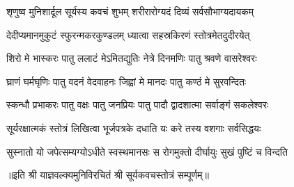 


\twolineshloka
{शृणुष्व मुनिशार्दूल सूर्यस्य कवचं शुभम्}
{शरीरारोग्यदं दिव्यं सर्वसौभाग्यदायकम्}

\twolineshloka
{देदीप्यमानमुकुटं स्फुरन्मकरकुण्डलम्}
{ध्यात्वा सहस्रकिरणं स्तोत्रमेतदुदीरयेत्}

\twolineshloka
{शिरो मे भास्करः पातु ललाटं मेऽमितद्युतिः}
{नेत्रे दिनमणिः पातु श्रवणे वासरेश्वरः}

\twolineshloka
{घ्राणं घर्मघृणिः पातु वदनं वेदवाहनः}
{जिह्वां मे मानदः पातु कण्ठं मे सुरवन्दितः}

\twolineshloka
{स्कन्धौ प्रभाकरः पातु वक्षः पातु जनप्रियः}
{पातु पादौ द्वादशात्मा सर्वाङ्गं सकलेश्वरः}

\twolineshloka
{सूर्यरक्षात्मकं स्तोत्रं लिखित्वा भूर्जपत्रके}
{दधाति यः करे तस्य वशगाः सर्वसिद्धयः}

\twolineshloka
{सुस्नातो यो जपेत्सम्यग्योऽधीते स्वस्थमानसः}
{स रोगमुक्तो दीर्घायुः सुखं पुष्टिं च विन्दति}

॥इति श्री याज्ञवल्क्यमुनिविरचितं श्री सूर्यकवचस्तोत्रं सम्पूर्णम्॥